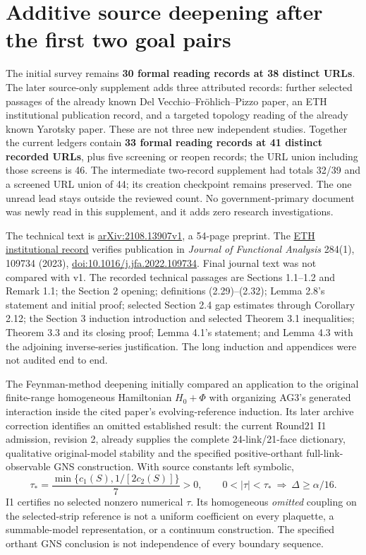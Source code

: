 \section{Additive source deepening after the first two goal pairs}
\label{app:source-supplement}
The initial survey remains \textbf{30 formal reading records at 38 distinct URLs}. The later source-only supplement adds three attributed records: further selected passages of the already known Del Vecchio--Fr\"ohlich--Pizzo paper, an ETH institutional publication record, and a targeted topology reading of the already known Yarotsky paper. These are not three new independent studies. Together the current ledgers contain \textbf{33 formal reading records at 41 distinct recorded URLs}, plus five screening or reopen records; the URL union including those screens is 46. The intermediate two-record supplement had totals 32/39 and a screened URL union of 44; its creation checkpoint remains preserved. The one unread lead stays outside the reviewed count. No government-primary document was newly read in this supplement, and it adds zero research investigations.

The technical text is \href{https://arxiv.org/abs/2108.13907}{arXiv:2108.13907v1}, a 54-page preprint. The \href{https://www.research-collection.ethz.ch/items/142ea4e3-1538-4f05-8a97-5200a860d558}{ETH institutional record} verifies publication in \emph{Journal of Functional Analysis} 284(1), 109734 (2023), \href{https://doi.org/10.1016/j.jfa.2022.109734}{doi:10.1016/j.jfa.2022.109734}. Final journal text was not compared with v1. The recorded technical passages are Sections 1.1--1.2 and Remark 1.1; the Section 2 opening; definitions (2.29)--(2.32); Lemma 2.8's statement and initial proof; selected Section 2.4 gap estimates through Corollary 2.12; the Section 3 induction introduction and selected Theorem 3.1 inequalities; Theorem 3.3 and its closing proof; Lemma 4.1's statement; and Lemma 4.3 with the adjoining inverse-series justification. The long induction and appendices were not audited end to end.

The Feynman-method deepening initially compared an application to the original finite-range homogeneous Hamiltonian $H_0+\Phi$ with organizing AG3's generated interaction inside the cited paper's evolving-reference induction. Its later archive correction identifies an omitted established result: the current Round21 I1 admission, revision 2, already supplies the complete 24-link/21-face dictionary, qualitative original-model stability and the specified positive-orthant full-link-observable GNS construction. With source constants left symbolic,
\begin{equation}
 \tau_* =\frac{\min\{c_1(S),1/[2c_2(S)]\}}7>0,\qquad
 0<|\tau|<\tau_*\ \Longrightarrow\ \Delta\ge\alpha/16.
\end{equation}
I1 certifies no selected nonzero numerical $\tau$. Its homogeneous \emph{omitted} coupling on the selected-strip reference is not a uniform coefficient on every plaquette, a summable-model representation, or a continuum construction. The specified orthant GNS conclusion is not independence of every boundary sequence.

